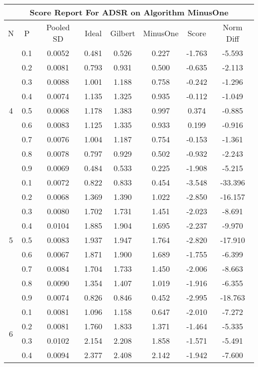 \documentclass[11pt,a4paper]{report}
\begin{document}
\begin{longtable}{ | c | c || c | c | c | c | c | c | }
\hline
\multicolumn{8}{|c|}{ Score Report For ADSR on Algorithm MinusOne} \\
\hline
N & P & Pooled SD &  Ideal &  Gilbert & MinusOne  & Score & Norm Diff \\
 \hline
 \hline
 \endhead
\multirow{9}{*}{4} & 0.1 & 0.0052 & 0.481 & 0.526 & 0.227 & -1.763 & -5.593 \\
 & 0.2 & 0.0081 & 0.793 & 0.931 & 0.500 & -0.635 & -2.113 \\
 & 0.3 & 0.0088 & 1.001 & 1.188 & 0.758 & -0.242 & -1.296 \\
 & 0.4 & 0.0074 & 1.135 & 1.325 & 0.935 & -0.112 & -1.049 \\
 & 0.5 & 0.0068 & 1.178 & 1.383 & 0.997 & 0.374 & -0.885 \\
 & 0.6 & 0.0083 & 1.125 & 1.335 & 0.933 & 0.199 & -0.916 \\
 & 0.7 & 0.0076 & 1.004 & 1.187 & 0.754 & -0.153 & -1.361 \\
 & 0.8 & 0.0078 & 0.797 & 0.929 & 0.502 & -0.932 & -2.243 \\
 & 0.9 & 0.0069 & 0.484 & 0.533 & 0.225 & -1.908 & -5.215 \\
 \hline
\multirow{9}{*}{5} & 0.1 & 0.0072 & 0.822 & 0.833 & 0.454 & -3.548 & -33.396 \\
 & 0.2 & 0.0068 & 1.369 & 1.390 & 1.022 & -2.850 & -16.157 \\
 & 0.3 & 0.0080 & 1.702 & 1.731 & 1.451 & -2.023 & -8.691 \\
 & 0.4 & 0.0104 & 1.885 & 1.904 & 1.695 & -2.237 & -9.970 \\
 & 0.5 & 0.0083 & 1.937 & 1.947 & 1.764 & -2.820 & -17.910 \\
 & 0.6 & 0.0067 & 1.871 & 1.900 & 1.689 & -1.755 & -6.399 \\
 & 0.7 & 0.0084 & 1.704 & 1.733 & 1.450 & -2.006 & -8.663 \\
 & 0.8 & 0.0090 & 1.354 & 1.407 & 1.019 & -1.916 & -6.355 \\
 & 0.9 & 0.0074 & 0.826 & 0.846 & 0.452 & -2.995 & -18.763 \\
 \hline
\multirow{9}{*}{6} & 0.1 & 0.0081 & 1.096 & 1.158 & 0.647 & -2.010 & -7.272 \\
 & 0.2 & 0.0081 & 1.760 & 1.833 & 1.371 & -1.464 & -5.335 \\
 & 0.3 & 0.0102 & 2.154 & 2.208 & 1.858 & -1.571 & -5.491 \\
 & 0.4 & 0.0094 & 2.377 & 2.408 & 2.142 & -1.942 & -7.600 \\

\end{longtable}
\end{document}
